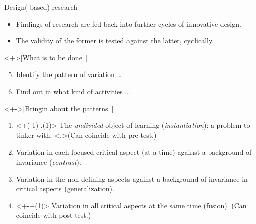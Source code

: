 \begin{frame}
  \begin{block}{Design(-based) 
    research~{\cite[p.~259]{NecessaryConditionsOfLearning}}}
    \begin{itemize}
      \item Findings of research are fed back into further cycles of innovative 
        design.
      \item The validity of the former is tested against the latter, 
        cyclically.
    \end{itemize}
  \end{block}
\end{frame}

\begin{frame}
  \begin{example}<+>[What is to be 
    done~{\cite[p.~257]{NecessaryConditionsOfLearning}}]
    \begin{enumerate}\setcounter{enumi}{4}
      \item Identify the pattern of variation \dots
      \item Find out in what kind of activities \dots
    \end{enumerate}
  \end{example}

  \begin{example}<+->[Bringin about the 
    patterns~{\cite[p.~263]{NecessaryConditionsOfLearning}}]
    \begin{enumerate}
      \item<+(-1)-.(1)> The \emph{undivided} object of learning 
        (\emph{instantiation}): a problem to tinker with.
        \alert<.>{(Can coincide with pre-test.)}

      \item<+> Variation in each focused critical aspect (at a time) against a 
        background of invariance (\emph{contrast}).

      \item<+> Variation in the non-defining aspects against a background of 
        invariance in critical aspects (generalization).

      \item<+-+(1)> Variation in all critical aspects at the same time 
        (fusion).
        \alert<+>{(Can coincide with post-test.)}
    \end{enumerate}
  \end{example}
\end{frame}

